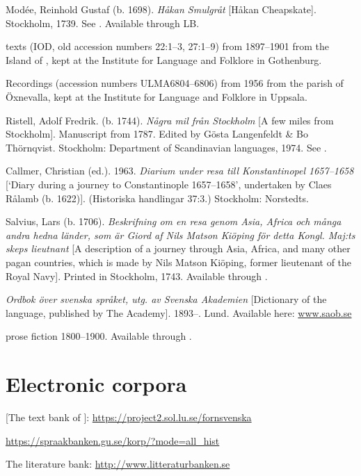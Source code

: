 \documentclass[output=paper]{langscibook}
\begin{document}
\begin{description}[font=\normalfont]
\item[Modée:] Modée, Reinhold Gustaf (b. 1698). \textit{Håkan Smulgråt} [Håkan Cheapskate]. Stockholm, 1739. See \citet{MarttalaStromquist2001}. Available through LB.
\item[\isi{Orust}:]  texts (IOD, old accession numbers 22:1–3, 27:1–9) from 1897–1901 from the Island of , kept at the Institute for Language and Folklore in Gothenburg.
\item[Öxn:] Recordings (accession numbers ULMA6804–6806) from 1956 from the parish of Öxnevalla, kept at the Institute for Language and Folklore in Uppsala.
\item[Ristell:] Ristell, Adolf Fredrik. (b. 1744). \textit{Några mil från Stockholm} [A few miles from Stockholm]. Manuscript from 1787. Edited by Gösta Langenfeldt \& Bo Thörnqvist. Stockholm: Department of Scandinavian languages, 1974. See \citet{MarttalaStromquist2001}.
\item[Rålamb:] Callmer, Christian (ed.). 1963. \textit{Diarium under resa till Konstantinopel 1657–1658} [`Diary during a journey to Constantinople 1657–1658’, undertaken by Claes Rålamb (b. 1622)]. (Historiska handlingar 37:3.) Stockholm: Norstedts.
\item[Salvius:] Salvius, Lars (b. 1706). \textit{Beskrifning om en resa genom Asia, Africa och många andra hedna länder, som är Giord af Nils Matson Kiöping för detta Kongl. Maj:ts skeps lieutnant} [A description of a journey through Asia, Africa, and many other pagan countries, which is made by Nils Matson Kiöping, former lieutenant of the Royal Navy]. Printed in Stockholm, 1743. Available through .
\item[\isi{SAOB}:] \textit{Ordbok över svenska språket, utg. av Svenska Akademien} [Dictionary of the  language, published by The  Academy]. 1893–. Lund. Available here: \href{http://www.saob.se}{{www.saob.se}}
\item[SPF:]  prose fiction 1800–1900. Available through .
\end{description}

\section*{Electronic corpora}

\begin{description}[font=\normalfont]
\item[FTB:]  [The text bank of ]: \url{https://project2.sol.lu.se/fornsvenska} 
\item[\isi{Korp}:] \url{https://spraakbanken.gu.se/korp/?mode=all_hist}
\item[LB:] The  literature bank: \url{http://www.litteraturbanken.se}
\end{description}

{\sloppy\printbibliography[heading=subbibliography,notkeyword=this]}
\end{document}
